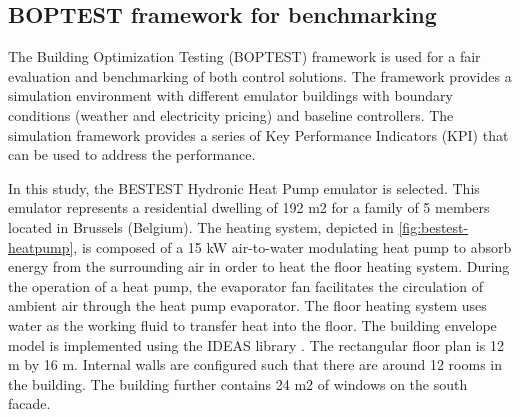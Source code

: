 
\newpage
\subsection{BOPTEST framework for benchmarking}
\label{sec:BOPTEST}
The Building Optimization Testing (BOPTEST) framework \cite{Blum2021} is used for a fair evaluation and benchmarking of both control solutions. The framework provides a simulation environment with different emulator buildings with boundary conditions (weather and electricity pricing) and baseline controllers. The simulation framework provides a series of Key Performance Indicators (KPI) that can be used to address the performance.

In this study, the BESTEST Hydronic Heat Pump emulator is selected. This emulator represents a residential dwelling of 192 m2 for a family of 5 members located in Brussels (Belgium).  The heating system, depicted in \ref{fig:bestest-heatpump}, is composed of a 15 kW air-to-water modulating heat pump to absorb energy from the surrounding air in order to heat the floor heating system. During the operation of a heat pump, the evaporator fan facilitates the circulation of ambient air through the heat pump evaporator. The floor heating system uses water as the working fluid to transfer heat into the floor. The building envelope model is implemented using the IDEAS library \cite{Jorissen2018}. The rectangular floor plan is 12 m by 16 m. Internal walls are configured such that there are around 12 rooms in the building. The building further contains 24 m2 of windows on the south facade.

